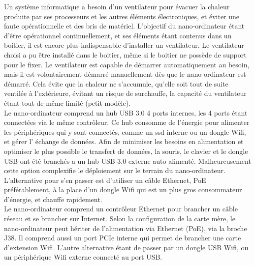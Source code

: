\noindent Un système informatique a besoin d'un ventilateur pour évacuer la chaleur produite par ses processeurs et les autres éléments électroniques, et éviter une faute opérationnelle et des bris de matériel. L'objectif du nano-ordinateur étant d'être opérationnel continuellement, et ses éléments étant contenus dans un boitier, il est encore plus indispensable d'installer un ventilateur. Le ventilateur choisi a pu être installé dans le boitier, même si le boitier ne possède de support pour le fixer. Le ventilateur est capable de démarrer automatiquement au besoin, mais il est volontairement démarré manuellement dès que le nano-ordinateur est démarré. Cela évite que la chaleur ne s'accumule, qu'elle soit tout de suite ventilée à l'extérieure, évitant un risque de surchauffe, la capacité du ventilateur étant tout de même limité (petit modèle).
\vspace{0.5\baselineskip}
\\
\noindent Le nano-ordinateur comprend un hub USB 3.0 4 ports internes, les 4 ports étant connectées via le même contrôleur. Ce hub consomme de l'énergie pour alimenter les périphériques qui y sont connectés, comme un \acrshort{ssd} interne ou un dongle Wifi, et gérer l’ échange de données. Afin de minimiser les besoins en alimentation et optimiser le plus possible le transfert de données, la souris, le clavier et le dongle USB ont été branchés a un hub USB 3.0 externe auto alimenté. Malheureusement cette option complexifie le déploiement sur le terrain du nano-ordinateur. L'alternative pour s'en passer est d'utiliser un câble Ethernet, PoE préférablement, à la place d'un dongle Wifi qui est un plus gros consommateur d'énergie, et chauffe rapidement.
\vspace{0.5\baselineskip}
\\
\noindent Le nano-ordinateur comprend un contrôleur Ethernet pour brancher un câble réseau et se brancher sur Internet. Selon la configuration de la carte mère, le nano-ordinateur peut hériter de l'alimentation via Ethernet (PoE), via la broche J38. Il comprend aussi un port PCIe interne qui permet de brancher une carte d'extension Wifi. L'autre alternative étant de passer par un dongle USB Wifi, ou un périphérique Wifi externe connecté au port USB. 
